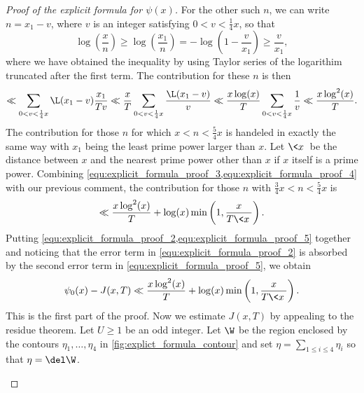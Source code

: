 \begin{proof}[Proof of the explicit formula for $\psi(x)$]
        For the other such $n$, we can write $n = x_{1}-v$, where $v$ is an integer satisfying $0 < v < \frac{1}{4}x$, so that
        \[
          \log\left(\frac{x}{n}\right) \ge \log\left(\frac{x_{1}}{n}\right) = -\log\left(1-\frac{v}{x_{1}}\right) \ge \frac{v}{x_{1}},
        \]
        where we have obtained the inequality by using Taylor series of the logarithim truncated after the first term. The contribution for these $n$ is then
        \begin{equation}\label{equ:explicit_formula_proof_4}
          \ll \sum_{0 < v < \frac{1}{4}x}\L(x_{1}-v)\frac{x_{1}}{Tv} \ll \frac{x}{T}\sum_{0 < v < \frac{1}{4}x}\frac{\L(x_{1}-v)}{v} \ll \frac{x\log(x)}{T}\sum_{0 < v < \frac{1}{4}x}\frac{1}{v} \ll \frac{x\log^{2}(x)}{T}.
        \end{equation}
        The contribution for those $n$ for which $x < n < \frac{5}{4}x$ is handeled in exactly the same way with $x_{1}$ being the least prime power larger than $x$. Let $\<x\>$ be the distance between $x$ and the nearest prime power other than $x$ if $x$ itself is a prime power. Combining \cref{equ:explicit_formula_proof_3,equ:explicit_formula_proof_4} with our previous comment, the contribution for those $n$ with $\frac{3}{4}x < n < \frac{5}{4}x$ is
        \begin{equation}\label{equ:explicit_formula_proof_5}
          \ll \frac{x\log^{2}(x)}{T}+\log(x)\min\left(1,\frac{x}{T\<x\>}\right).
        \end{equation}
        Putting \cref{equ:explicit_formula_proof_2,equ:explicit_formula_proof_5} together and noticing that the error term in \cref{equ:explicit_formula_proof_2} is absorbed by the second error term in \cref{equ:explicit_formula_proof_5}, we obtain
        \begin{equation}\label{equ:explicit_formula_proof_6}
          \psi_{0}(x)-J(x,T) \ll \frac{x\log^{2}(x)}{T}+\log(x)\min\left(1,\frac{x}{T\<x\>}\right).
        \end{equation}
        This is the first part of the proof. Now we estimate $J(x,T)$ by appealing to the residue theorem. Let $U \ge 1$ be an odd integer. Let $\W$ be the region enclosed by the contours $\eta_{1},\ldots,\eta_{4}$ in \cref{fig:explict_formula_contour} and set $\eta = \sum_{1 \le i \le 4}\eta_{i}$ so that $\eta = \del \W$.

        \begin{figure}[ht]
          \centering
\end{figure}
\end{proof}
